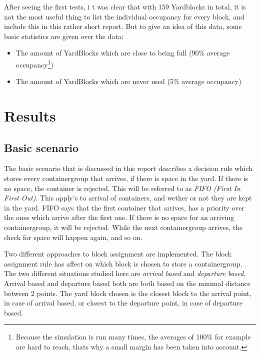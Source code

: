 \documentclass[]{article}
\begin{document}
After seeing the first tests, i t was clear that with 159 Yardblocks in total,
it is not the most useful thing to list the individual occupancy for every
block, and include this in this rather short report. But to give an idea of
this data, some basic statistics are given over the data: \begin{itemize}
	\item The amount of YardBlocks which are close to being full (90\% average
	      occupancy\footnote{\label{margin} Because the simulation is run many times, the
		      averages of 100\% for example are hard to reach, thats why a small margin has
		      been taken into account.})
	\item The amount of YardBlocks which are never used (5\% average
	      occupancy)
\end{itemize}

\section{Results}

\subsection{Basic scenario}
The basic scenario that is discussed in this report describes a decision rule
which stores every containergroup that arrives, if there is space in the yard.
If there is no space, the container is rejected. This will be referred to as
\textit{FIFO (First In First Out)}. This apply's to arrival of containers, and
wether or not they are kept in the yard. FIFO says that the first container
that arrives, has a priority over the ones which arrive after the first one. If
there is no space for an arriving containergroup, it will be rejected. While
the next containergroup arrives, the check for space will happen again, and so
on.

Two different approaches to block assignment are implemented. The block
assignment rule has affect on which block is chosen to store a containergroup.
The two different situations studied here are \textit{arrival based} and
\textit{departure based}. Arrival based and departure based both are both based
on the minimal distance between 2 points. The yard block chosen is the closest
block to the arrival point, in case of arrival based, or closest to the
departure point, in case of departure based.
\end{document}

